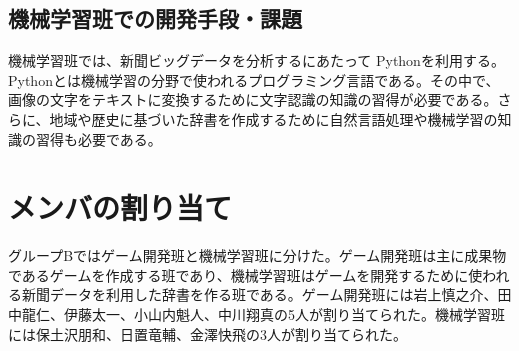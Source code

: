 
\subsection{機械学習班での開発手段・課題}
機械学習班では、新聞ビッグデータを分析するにあたって Pythonを利用する。Pythonとは機械学習の分野で使われるプログラミング言語である。その中で、画像の文字をテキストに変換するために文字認識の知識の習得が必要である。さらに、地域や歴史に基づいた辞書を作成するために自然言語処理や機械学習の知識の習得も必要である。

\section{メンバの割り当て}
グループBではゲーム開発班と機械学習班に分けた。ゲーム開発班は主に成果物であるゲームを作成する班であり、機械学習班はゲームを開発するために使われる新聞データを利用した辞書を作る班である。ゲーム開発班には岩上慎之介、田中龍仁、伊藤太一、小山内魁人、中川翔真の5人が割り当てられた。機械学習班には保土沢朋和、日置竜輔、金澤快飛の3人が割り当てられた。
